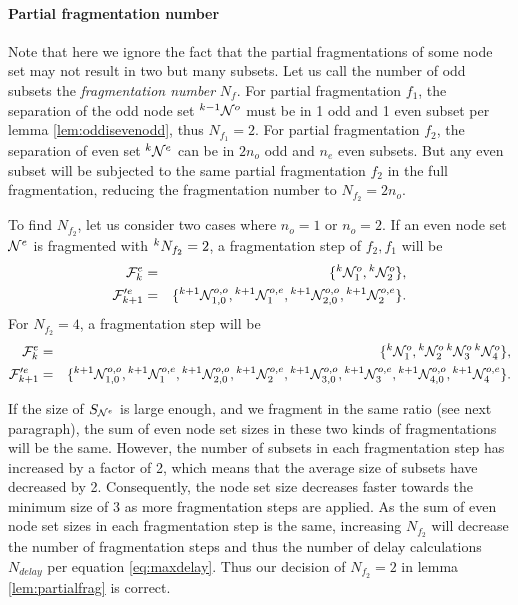 \paragraph{Partial fragmentation number}
Note that here we ignore the fact that the partial fragmentations of some node set may not result in two but many subsets. Let us call the number of odd subsets the \emph{fragmentation number} $N_f$. For partial fragmentation $f_1$, the separation of the odd node set ${}^{k-1}\mathcal{N}^o$ must be in 1 odd and 1 even subset per lemma \ref{lem:oddisevenodd}, thus $N_{f_1} = 2$. For partial fragmentation $f_2$, the separation of even set ${}^{k}\mathcal{N}^e$ can be in $2n_o$ odd and $n_e$ even subsets. But any even subset will be subjected to the same partial fragmentation $f_2$ in the full fragmentation, reducing the fragmentation number to $N_{f_2} = 2n_o$.

To find $N_{f_2} $, let us consider two cases where $n_o = 1$ or $n_o=2$. If an even node set $\mathcal{N}^e$ is fragmented with ${}^{k}N_{f_2}=2$, a fragmentation step of $f_2, f_1$ will be
\begin{eqnarray*}
  \mathcal{F}^e_k &=& \{ {}^{k} \mathcal{N}^{o}_1, {}^{k} \mathcal{N}^{o}_2\},  \\
  \mathcal{F}'^e_{k+1} &=& \{{}^{k+1}\mathcal{N}^{o,o}_{1,0}, {}^{k+1}\mathcal{N}^{o,e}_1, {}^{k+1}\mathcal{N}^{o,o}_{2,0}, {}^{k+1}\mathcal{N}^{o,e}_2 \}.
\end{eqnarray*}
For $N_{f_2} = 4$, a fragmentation step will be
\begin{eqnarray*}
  \mathcal{F}^e_k &=& \{ {}^{k}\mathcal{N}^{o}_1, {}^{k}\mathcal{N}^{o}_2\,  {}^{k}\mathcal{N}^{o}_3\, {}^{k}\mathcal{N}^{o}_4\},  \\
  \mathcal{F}'^e_{k+1} &=& \{{}^{k+1}\mathcal{N}^{o,o}_{1,0}, {}^{k+1}\mathcal{N}^{o,e}_1,  {}^{k+1}\mathcal{N}^{o,o}_{2,0}, {}^{k+1}\mathcal{N}^{o,e}_2,  {}^{k+1}\mathcal{N}^{o,o}_{3,0}, {}^{k+1}\mathcal{N}^{o,e}_3, {}^{k+1}\mathcal{N}^{o,o}_{4,0}, {}^{k+1}\mathcal{N}^{o,e}_4 \}.
\end{eqnarray*}

If the size of $S_{\mathcal{N}^e}$ is large enough, and we fragment in the same ratio (see next paragraph), the sum of even node set sizes in these two kinds of fragmentations will be the same. However, the number of subsets in each fragmentation step has increased by a factor of 2, which means that the average size of subsets have decreased by 2. Consequently, the node set size decreases faster towards the minimum size of 3 as more fragmentation steps are applied. As the sum of even node set sizes in each fragmentation step is the same, increasing $N_{f_2}$ will decrease the number of fragmentation steps and thus the number of delay calculations $N_{delay}$ per equation \ref{eq:maxdelay}. Thus our decision of $N_{f_2}=2$ in lemma \ref{lem:partialfrag} is correct.

